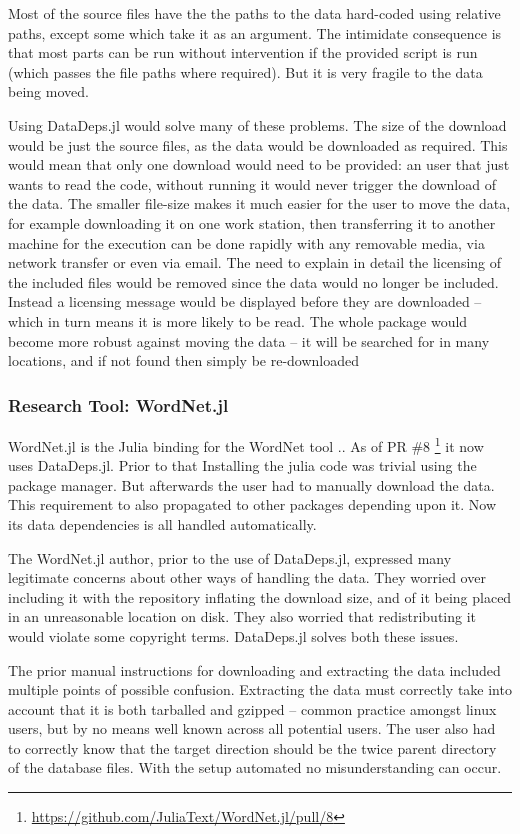 \documentclass[twoside,11pt]{article}\usepackage{jmlr2e}
\begin{document}
Most of the source files have the the paths to the data hard-coded using relative paths, except some which take it as an argument.
The intimidate consequence is that most parts can be run without intervention if the provided script is run (which passes the file paths where required).
But it is very fragile to the data being moved.

Using DataDeps.jl would solve many of these problems.
The size of the download would be just the source files, as the data would be downloaded as required.
This would mean that only one download would need to be provided: an user that just wants to read the code, without running it would never trigger the download of the data.
The smaller file-size makes it much easier for the user to move the data, for example downloading it on one work station, then transferring it to another machine for the execution can be done rapidly with any removable media, via network transfer or even via email.
The need to explain in detail the licensing of the included files would be removed since the data would no longer be included.
Instead a licensing message would be displayed before they are downloaded -- which in turn means it is more likely to be read.
The whole package would become more robust against moving the data -- it will be searched for in many locations, and if not found then simply be re-downloaded


\subsubsection{Research Tool: WordNet.jl}
WordNet.jl is the Julia binding for the WordNet tool \citep{miller1995wordnet}..
As of PR \#8 \footnote{\url{https://github.com/JuliaText/WordNet.jl/pull/8}} it now uses DataDeps.jl.
Prior to that 
Installing the julia code was trivial using the package manager.
But afterwards the user had to manually download the data.
This requirement to also propagated to other packages depending upon it.
Now its data dependencies is all handled automatically.

The WordNet.jl author, prior to the use of DataDeps.jl, expressed many legitimate concerns about other ways of handling the data.
They worried over including it with the repository inflating the download size, and of it being placed in an unreasonable location on disk.
They also worried that redistributing it would violate some copyright terms.
DataDeps.jl solves both these issues.

The prior manual instructions for downloading and extracting the data included multiple points of possible confusion.
Extracting the data must correctly take into account that it is both tarballed and gzipped -- common practice amongst linux users, but by no means well known across all potential users.
The user also had to correctly know that the target direction should be the twice parent directory of the database files.
With the setup automated no misunderstanding can occur.
\end{document}
